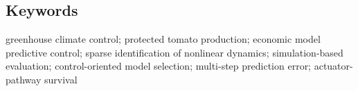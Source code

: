 \subsection{Keywords}

greenhouse climate control; protected tomato production; economic model predictive
control; sparse identification of nonlinear dynamics; simulation-based evaluation;
control-oriented model selection; multi-step prediction error; actuator-pathway survival


